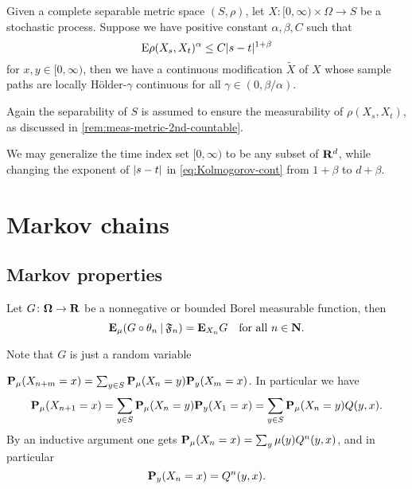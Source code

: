 \documentclass[10pt]{book}
\begin{document}
\begin{namedthm} \label{thm:Kolmogorov-cont}
    Given a complete separable metric space $(S,\rho)$, let $X\colon [0,\infty) \times \Omega \to S$ be a stochastic process. Suppose we have positive constant $\alpha,\beta,C$ such that \begin{equation} \label{eq:Kolmogorov-cont}
        \E\rho(X_s,X_t)^\alpha \leq C \abs{s - t}^{1 + \beta}
    \end{equation}
    for $x,y \in [0,\infty)$, then we have a continuous modification $\widetilde{X}$ of $X$ whose sample paths are locally Hölder-$\gamma$ continuous for all $\gamma \in (0,\beta / \alpha)$.
\end{namedthm}

Again the separability of $S$ is assumed to ensure the measurability of $\rho(X_s,X_t)$, as discussed in \cref{rem:meas-metric-2nd-countable}.

We may generalize the time index set $[0,\infty)$ to be any subset of $\mathbf{R}^d$, while changing the exponent of $\lvert s - t \rvert$ in \eqref{eq:Kolmogorov-cont} from $1 + \beta$ to $d + \beta$.




\chapter{Markov chains}

\section{Markov properties} \label{sec:Markov-property}

\begin{namedthm}
    Let $G\colon \mathbf \Omega \to \mathbf{R}$ be a nonnegative or bounded Borel measurable function, then 
    \[
        \mathop{}\!\mathbf{E}_\mu(G\circ \theta_n \mathbin{|} \mathfrak F_n)= \mathop{}\!\mathbf{E}_{X_n}G \quad\text{for all }n\in \mathbf{N}.
    \]
\end{namedthm}

Note that $G$ is just a random variable

\begin{namedthm}
    $\mathbf{P}_\mu(X_{n+m} = x) = \sum_{y\in S} \mathbf{P}_\mu(X_{n} = y)\mathbf{P}_y(X_{m} = x)$. In particular we have \[
        \mathbf{P}_\mu(X_{n+1} = x) = \sum_{y\in S} \mathbf{P}_\mu(X_{n} = y)\mathbf{P}_y(X_{1} = x) = \sum_{y\in S} \mathbf{P}_\mu(X_{n} = y) Q(y,x).
    \] By an inductive argument one gets $\mathbf{P}_\mu(X_n = x) = \sum_y\mu(y) Q^n(y,x)$, and in particular \[
        \mathbf{P}_y(X_n = x) = Q^n(y,x).
    \]
\end{namedthm}
\end{document}
